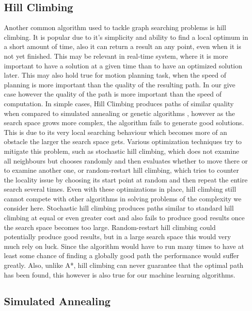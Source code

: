 \subsection{Hill Climbing}
\label{sec:hill_climbing}

Another common algorithm used to tackle graph searching problems is hill climbing. It is popular due to it's simplicity and ability to find a local optimum in a short amount of time, also it can return a result an any point, even when it is not yet finished. This may be relevant in real-time system, where it is more important to have a solution at a given time than to have an optimized solution later. This may also hold true for motion planning task, when the speed of planning is more important than the quality of the resulting path. In our give case however the quality of the path is more important than the speed of computation. In simple cases, Hill Climbing produces paths of similar quality when compared to simulated annealing or genetic algorithms \cite{8}, however as the search space grows more complex, the algorithm fails to generate good solutions. This is due to its very local searching behaviour which becomes more of an obstacle the larger the search space gets. Various optimization techniques try to mitigate this problem, such as stochastic hill climbing, \label{sec:stochastic_hill_climbing} which does not examine all neighbours but chooses randomly and then evaluates whether to move there or to examine another one, or random-restart hill climbing, which tries to counter the locality issue by choosing its start point at random and then repeat the entire search several times. Even with these optimizations in place, hill climbing still cannot compete with other algorithms in solving problems of the complexity we consider here. Stochastic hill climbing produces paths similar to standard hill climbing at equal or even greater cost \cite{8} and also fails to produce good results once the search space becomes too large. Random-restart hill climbing could potentially produce good results, but in a large search space this would very much rely on luck. Since the algorithm would have to run many times to have at least some chance of finding a globally good path the performance would suffer greatly. Also, unlike A*, hill climbing can never guarantee that the optimal path has been found, this however is also true for our machine learning algorithms.

\subsection{Simulated Annealing}
\label{sec:simulated_annealing}

